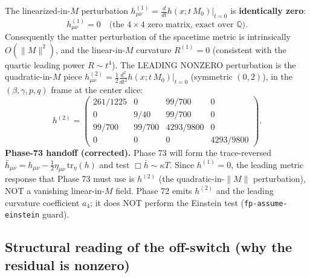 The linearized-in-$M$ perturbation $h^{(1)}_{\mu\nu}=\frac{d}{dt}h(x;t\,M_0)|_{t=0}$ is
\textbf{identically zero}:
\begin{equation}
  h^{(1)}_{\mu\nu} = 0 \quad\text{(the }4\times4\text{ zero matrix, exact over }\mathbb{Q}).
\end{equation}
Consequently the matter perturbation of the spacetime metric is intrinsically
$O(\|M\|^2)$, and the linear-in-$M$ curvature $R^{(1)}=0$ (consistent with the quartic
leading power $R\sim t^4$). The LEADING NONZERO perturbation is the quadratic-in-$M$ piece
$h^{(2)}_{\mu\nu}=\tfrac12\frac{d^2}{dt^2}h(x;t\,M_0)|_{t=0}$ (symmetric $(0,2)$), in the
$(\beta,\gamma,p,q)$ frame at the center slice:
\begin{equation}
  h^{(2)} =
  \begin{pmatrix}
    261/1225 & 0      & 99/700   & 0 \\
    0        & 9/40   & 99/700   & 0 \\
    99/700   & 99/700 & 4293/9800 & 0 \\
    0        & 0      & 0        & 4293/9800
  \end{pmatrix}.
\end{equation}
\textbf{Phase-73 handoff (corrected).} Phase 73 will form the trace-reversed
$\bar h_{\mu\nu}=h_{\mu\nu}-\tfrac12\eta_{\mu\nu}\,\mathrm{tr}_\eta(h)$ and test
$\Box\bar h\sim\kappa T$. Since $h^{(1)}=0$, the leading metric response that Phase 73
must use is $h^{(2)}$ (the quadratic-in-$\|M\|$ perturbation), NOT a vanishing
linear-in-$M$ field. Phase 72 emits $h^{(2)}$ and the leading curvature coefficient
$a_4$; it does NOT perform the Einstein test (\texttt{fp-assume-einstein} guard).

\subsection{Structural reading of the off-switch (why the residual is nonzero)}
\label{sec:offswitch-structure}

